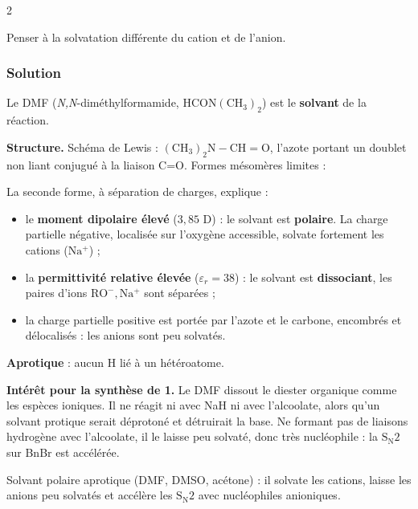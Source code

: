\documentclass[11pt,a4paper]{article}
\providecommand{\tightlist}{\setlength{\itemsep}{0pt}\setlength{\parskip}{0pt}}
\newcommand{\equationajustee}[1]{%
  \sbox{\boiteequation}{$\displaystyle #1$}%
  \ifdim\wd\boiteequation>\linewidth
    \[\resizebox{\linewidth}{!}{\usebox{\boiteequation}}\]%
  \else
    \[#1\]%
  \fi}
\begin{document}
\begin{indication}{2}

Penser à la solvatation différente du cation et de l'anion.

\end{indication}

\hypertarget{solution-30}{%
\subsubsection{Solution}\label{solution-30}}

Le DMF (\emph{N,N}-diméthylformamide, \(\mathrm{HCON(CH_3)_2}\)) est le \textbf{solvant} de la réaction.

\textbf{Structure.} Schéma de Lewis : \(\mathrm{(CH_3)_2N{-}CH{=}O}\), l'azote portant un doublet non liant conjugué à la liaison C=O. Formes mésomères limites :

\equationajustee{\mathrm{(CH_3)_2\ddot N{-}CH{=}O}\ \longleftrightarrow\ \mathrm{(CH_3)_2N^+{=}CH{-}O^-}}

La seconde forme, à séparation de charges, explique :

\begin{itemize}
\tightlist
\item
  le \textbf{moment dipolaire élevé} (\(3{,}85\) D) : le solvant est \textbf{polaire}. La charge partielle négative, localisée sur l'oxygène accessible, solvate fortement les cations (\(\mathrm{Na^+}\)) ;
\item
  la \textbf{permittivité relative élevée} (\(\varepsilon_r=38\)) : le solvant est \textbf{dissociant}, les paires d'ions \(\mathrm{RO^-,Na^+}\) sont séparées ;
\item
  la charge partielle positive est portée par l'azote et le carbone, encombrés et délocalisés : les anions sont peu solvatés.
\end{itemize}

\textbf{Aprotique} : aucun H lié à un hétéroatome.

\textbf{Intérêt pour la synthèse de 1.} Le DMF dissout le diester organique comme les espèces ioniques. Il ne réagit ni avec NaH ni avec l'alcoolate, alors qu'un solvant protique serait déprotoné et détruirait la base. Ne formant pas de liaisons hydrogène avec l'alcoolate, il le laisse peu solvaté, donc très nucléophile : la \(\mathrm{S_N2}\) sur BnBr est accélérée.

\begin{methode}

Solvant polaire aprotique (DMF, DMSO, acétone) : il solvate les cations, laisse les anions peu solvatés et accélère les \(\mathrm{S_N2}\) avec nucléophiles anioniques.

\end{methode}
\end{document}
